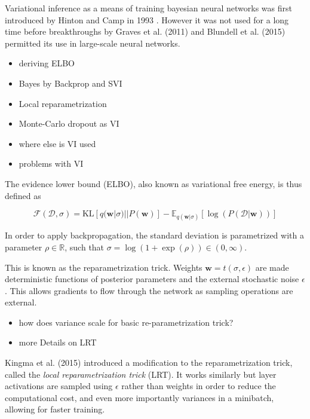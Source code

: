 	Variational inference as a means of training bayesian neural networks was first introduced by Hinton and Camp in 1993 \cite{hinton_keeping_1993}. However it was not used for a long time before breakthroughs by Graves et al. (2011) \cite{graves_practical_2011} and Blundell et al. (2015) \cite{blundell_weight_2015} permitted its use in large-scale neural networks. 
	
	 

	\begin{itemize}
		\item deriving ELBO
		
		
		\item Bayes by Backprop and SVI
		\item Local reparametrization
		\item Monte-Carlo dropout as VI
		\item where else is VI used
		\item problems with VI
	\end{itemize}

	The evidence lower bound (ELBO), also known as variational free energy, is thus defined as 
	
	\begin{equation}
	\label{eq:elbo}
		\mathcal{F}(\mathcal{D}, \sigma) = 
		\text{KL}[q(\pmb{w}|\sigma) || P(\pmb{w})] - \mathbb{E}_{q(\pmb{w}|\sigma)}[\log(P(\mathcal{D}|\pmb{w}))]
	\end{equation}

	In order to apply backpropagation, the standard deviation is parametrized with a parameter $\rho \in \mathbb{R}$, such that $\sigma = \log(1 + \exp(\rho)) \in (0,\infty)$. 
	
	This is known as the reparametrization trick. Weights $\pmb{w} = t(\sigma, \epsilon)$ are made deterministic functions of posterior parameters and the external stochastic noise $\epsilon$. This allows gradients to flow through the network as sampling operations are external. 
	
	\begin{itemize}
		\item how does variance scale for basic re-parametrization trick?
		\item more Details on LRT
	\end{itemize}

	Kingma et al. (2015) \cite{kingma_variational_2015} introduced a modification to the reparametrization trick, called the \textit{local reparametrization trick} (LRT). It works similarly but layer activations are sampled using $\epsilon$ rather than weights in order to reduce the computational cost, and even more importantly variances in a minibatch, allowing for faster training. 
	
